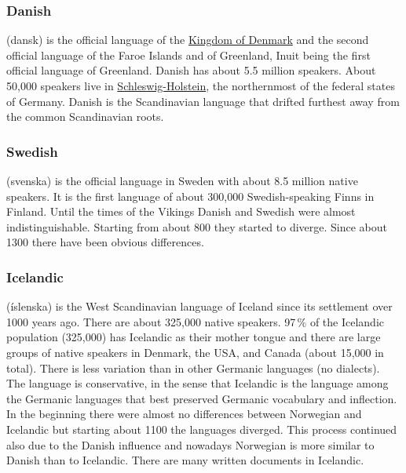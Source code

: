 \subsubsection{Danish}

 (dansk) is the official language of the
\href{https://en.wikipedia.org/wiki/Denmark}{Kingdom of Denmark} and the second official language of the
Faroe Islands and of Greenland, Inuit being the first official language of
Greenland. Danish has about 5.5 million speakers. About 50,000 speakers live in \href{https://en.wikipedia.org/wiki/Schleswig-Holstein}{Schleswig-Holstein}, the northernmost of the federal states of Germany.
Danish is the Scandinavian language that drifted furthest away from the common Scandinavian roots.


\subsubsection{Swedish}

 (svenska) is the official language in Sweden with about 8.5 million native speakers. It is
the first language of about 300,000 Swedish-speaking Finns in Finland. Until the times of the
Vikings Danish and Swedish were almost indistinguishable. Starting from about 800 they started to
diverge. Since about 1300 there have been obvious differences.



\subsubsection{Icelandic}


 (íslenska) is the West Scandinavian language of Iceland since its settlement over 1000 years ago. 
There are about 325,000 native speakers. 97\,\% of the Icelandic population (325,000) has Icelandic as their
mother tongue and there are large groups of native speakers in Denmark, the USA, and Canada
(about 15,000 in total). 
There is less variation than in other Germanic languages (no dialects). 
The language is conservative, in the sense that Icelandic
is the language among the Germanic languages that best preserved Germanic vocabulary and inflection.
In the beginning there were almost no differences between Norwegian and Icelandic but
starting about 1100 the languages diverged. This process continued also due to the Danish
influence and nowadays Norwegian is more similar to Danish than to Icelandic. There are many written documents in Icelandic.

